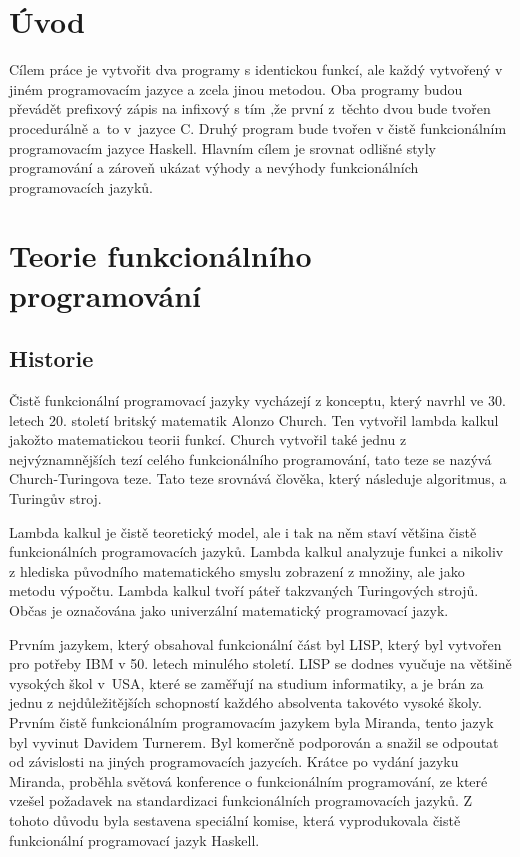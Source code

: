 \documentclass[12pt,a4paper]{report}
\begin{document}



\tableofcontents

\chapter{Úvod}
Cílem práce je vytvořit dva programy s identickou funkcí, ale každý vytvořený v jiném programovacím jazyce a zcela jinou metodou. Oba programy budou převádět prefixový zápis na infixový s tím ,že první z~těchto dvou bude tvořen procedurálně a~to v~jazyce C. Druhý program bude tvořen v čistě funkcionálním programovacím jazyce Haskell. Hlavním cílem je srovnat odlišné styly programování a zároveň ukázat výhody a nevýhody funkcionálních programovacích jazyků. 

\chapter{Teorie funkcionálního programování} %

\section{Historie}
Čistě funkcionální programovací jazyky vycházejí z konceptu, který navrhl ve 30. letech 20. století britský matematik Alonzo Church. Ten vytvořil lambda kalkul jakožto matematickou teorii funkcí. Church vytvořil také jednu z nejvýznamnějších tezí celého funkcionálního programování, tato teze se nazývá Church-Turingova teze. \cite{Funk. prog. wiki.} Tato teze srovnává člověka, který následuje algoritmus, a Turingův stroj.

Lambda kalkul je čistě teoretický model, ale i tak na něm staví většina čistě funkcionálních programovacích jazyků. Lambda kalkul analyzuje funkci a nikoliv z hlediska původního matematického smyslu zobrazení z množiny, ale jako metodu výpočtu. \cite{lambda kalkul wiki.} Lambda kalkul tvoří páteř takzvaných Turingových strojů. Občas je označována jako univerzální matematický programovací jazyk.

Prvním jazykem, který obsahoval funkcionální část byl LISP, který byl vytvořen pro potřeby IBM v 50. letech minulého století. LISP se dodnes vyučuje na většině vysokých škol v~USA, které se zaměřují na studium informatiky, a je brán za jednu z nejdůležitějších schopností každého absolventa takovéto vysoké školy. Prvním čistě funkcionálním programovacím jazykem byla Miranda, tento jazyk byl vyvinut Davidem Turnerem. Byl komerčně podporován a snažil se odpoutat od závislosti na jiných programovacích jazycích. Krátce po vydání jazyku Miranda, proběhla světová konference o funkcionálním programování, ze které vzešel požadavek na standardizaci funkcionálních programovacích jazyků. \cite{Funk. prog. wiki.} Z tohoto důvodu byla sestavena speciální komise, která vyprodukovala čistě funkcionální programovací jazyk Haskell. 
\end{document}
